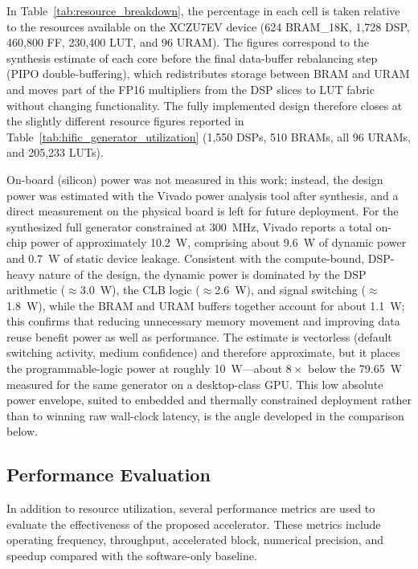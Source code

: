 In Table~\ref{tab:resource_breakdown}, the percentage in each cell is taken relative to the resources available on the XCZU7EV device (624 BRAM\_18K, 1{,}728 DSP, 460{,}800 FF, 230{,}400 LUT, and 96 URAM). The figures correspond to the synthesis estimate of each core before the final data-buffer rebalancing step (PIPO double-buffering), which redistributes storage between BRAM and URAM and moves part of the FP16 multipliers from the DSP slices to LUT fabric without changing functionality. The fully implemented design therefore closes at the slightly different resource figures reported in Table~\ref{tab:hific_generator_utilization} (1,550 DSPs, 510 BRAMs, all 96 URAMs, and 205,233 LUTs).

On-board (silicon) power was not measured in this work; instead, the design power was estimated with the Vivado power analysis tool after synthesis, and a direct measurement on the physical board is left for future deployment. For the synthesized full generator constrained at 300~MHz, Vivado reports a total on-chip power of approximately 10.2~W, comprising about 9.6~W of dynamic power and 0.7~W of static device leakage. Consistent with the compute-bound, DSP-heavy nature of the design, the dynamic power is dominated by the DSP arithmetic ($\approx$3.0~W), the CLB logic ($\approx$2.6~W), and signal switching ($\approx$1.8~W), while the BRAM and URAM buffers together account for about 1.1~W; this confirms that reducing unnecessary memory movement and improving data reuse benefit power as well as performance. The estimate is vectorless (default switching activity, medium confidence) and therefore approximate, but it places the programmable-logic power at roughly 10~W---about $8\times$ below the 79.65~W measured for the same generator on a desktop-class GPU. This low absolute power envelope, suited to embedded and thermally constrained deployment rather than to winning raw wall-clock latency, is the angle developed in the comparison below.

\subsection{Performance Evaluation}

In addition to resource utilization, several performance metrics are used to evaluate the effectiveness of the proposed accelerator. These metrics include operating frequency, throughput, accelerated block, numerical precision, and speedup compared with the software-only baseline.

